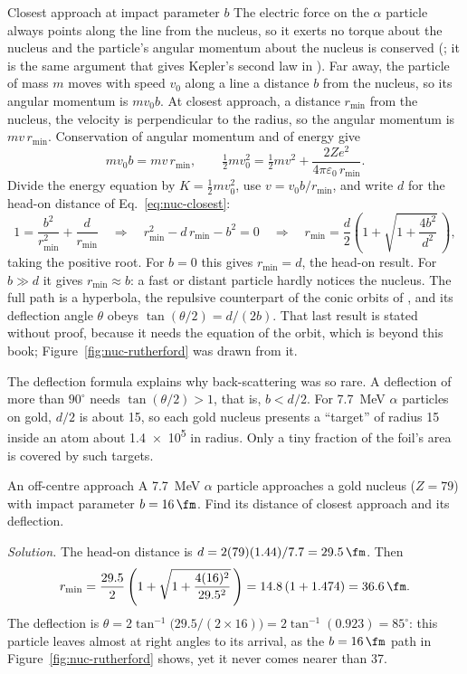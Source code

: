 \begin{derivbox}{Closest approach at impact parameter \texorpdfstring{$b$}{b}}
The electric force on the $\alpha$ particle always points along the line from the nucleus, so it
exerts no torque about the nucleus and the particle's angular momentum about the nucleus is conserved
(; it is the same argument that gives Kepler's second law in ).
Far away, the particle of mass $m$ moves with speed $v_0$ along a line a distance $b$ from the nucleus,
so its angular momentum is $mv_0b$. At closest approach, a distance $r_{\min}$ from the nucleus, the
velocity is perpendicular to the radius, so the angular momentum is $mv\,r_{\min}$. Conservation of
angular momentum and of energy give
\[
mv_0b=mv\,r_{\min},\qquad
\tfrac12mv_0^2=\tfrac12mv^2+\frac{2Ze^2}{4\pi\varepsilon_0\,r_{\min}}.
\]
Divide the energy equation by $K=\tfrac12mv_0^2$, use $v=v_0b/r_{\min}$, and write $d$ for the head-on
distance of Eq.~\eqref{eq:nuc-closest}:
\[
1=\frac{b^2}{r_{\min}^2}+\frac{d}{r_{\min}}
\quad\Longrightarrow\quad
r_{\min}^2-d\,r_{\min}-b^2=0
\quad\Longrightarrow\quad
r_{\min}=\frac{d}{2}\left(1+\sqrt{1+\frac{4b^2}{d^2}}\,\right),
\]
taking the positive root. For $b=0$ this gives $r_{\min}=d$, the head-on result. For $b\gg d$ it gives
$r_{\min}\approx b$: a fast or distant particle hardly notices the nucleus. The full path is a hyperbola,
the repulsive counterpart of the conic orbits of , and its deflection angle $\theta$
obeys $\tan(\theta/2)=d/(2b)$. That last result is stated without proof, because it needs the
equation of the orbit, which is beyond this book; Figure~\ref{fig:nuc-rutherford} was drawn from it.
\end{derivbox}

The deflection formula explains why back-scattering was so rare. A deflection of more than $90^\circ$
needs $\tan(\theta/2)>1$, that is, $b<d/2$. For \SI{7.7}{\MeV} $\alpha$ particles on gold, $d/2$ is
about \SI{15}{\fm}, so each gold nucleus presents a ``target'' of radius \SI{15}{\fm} inside an atom about
\SI{1.4e5}{\fm} in radius. Only a tiny fraction of the foil's area is covered by such targets.

\begin{exbox}{An off-centre approach}\label{ex:nuc-offcentre}
A \SI{7.7}{\MeV} $\alpha$ particle approaches a gold nucleus ($Z=79$) with impact parameter
$b=\SI{16}{\fm}$. Find its distance of closest approach and its deflection.

\emph{Solution.} The head-on distance is $d=2(79)(1.44)/7.7=\SI{29.5}{\fm}$. Then
\[
r_{\min}=\frac{29.5}{2}\left(1+\sqrt{1+\frac{4(16)^2}{29.5^2}}\,\right)=14.8\,(1+1.474)=\SI{36.6}{\fm}.
\]
The deflection is $\theta=2\tan^{-1}\!\big(29.5/(2\times16)\big)=2\tan^{-1}(0.923)=85^\circ$: this
particle leaves almost at right angles to its arrival, as the $b=\SI{16}{\fm}$ path in
Figure~\ref{fig:nuc-rutherford} shows, yet it never comes nearer than \SI{37}{\fm}.
\end{exbox}

